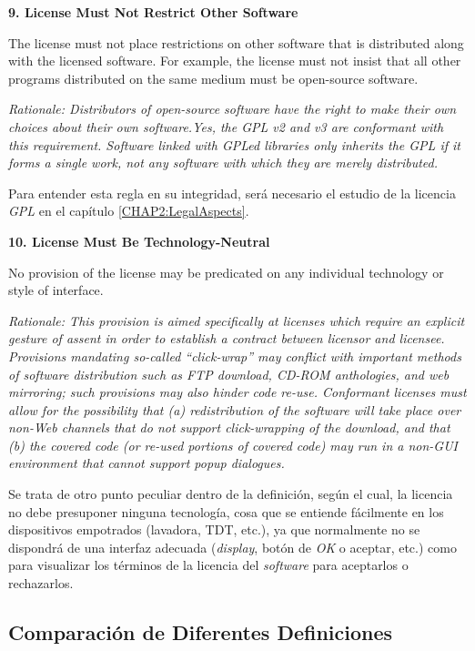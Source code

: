 {\bf 9. License Must Not Restrict Other Software

The license must not place restrictions on other software that is distributed
along with the licensed software. For example, the license must not insist that
all other programs distributed on the same medium must be open-source software.}

\textit{Rationale: Distributors of open-source software have the right to make
their own choices about their own software.\newline Yes, the GPL v2 and v3 are
conformant with this requirement. Software linked with GPLed libraries only
inherits the GPL if it forms a single work, not any software with which they are
merely distributed.}\vspace{0.4cm}

Para entender esta regla en su integridad, será necesario el estudio de la
licencia \textit{GPL} en el capítulo \ref{CHAP2:LegalAspects}.\vspace{0.4cm}

{\bf 10. License Must Be Technology-Neutral

No provision of the license may be predicated on any individual technology or
style of interface.}

\textit{Rationale: This provision is aimed specifically at licenses which
require an explicit gesture of assent in order to establish a contract between
licensor and licensee. Provisions mandating so-called ``click-wrap'' may
conflict with important methods of software distribution such as FTP download,
CD-ROM anthologies, and web mirroring; such provisions may also hinder code
re-use. Conformant licenses must allow for the possibility that (a)
redistribution of the software will take place over non-Web channels that do not
support click-wrapping of the download, and that (b) the covered code (or
re-used portions of covered code) may run in a non-GUI environment that cannot
support popup dialogues.}\vspace{0.4cm}

Se trata de otro punto peculiar dentro de la definición, según el cual, la
licencia no debe presuponer ninguna tecnología, cosa que se entiende
fácilmente en los dispositivos empotrados (lavadora, TDT, etc.), ya que
normalmente no se dispondrá de una interfaz adecuada (\textit{display}, botón de
\textit{OK} o aceptar, etc.) como para visualizar los términos de la licencia
del \textit{software} para aceptarlos o rechazarlos.

\subsection{Comparación de Diferentes Definiciones}

